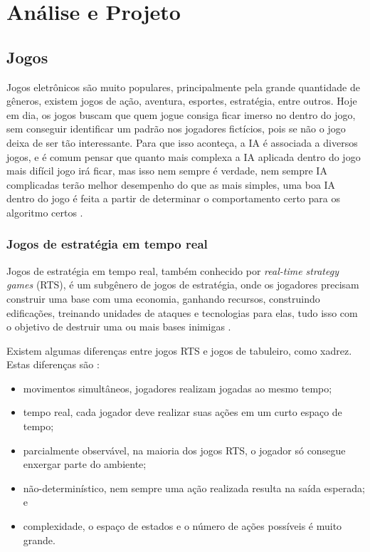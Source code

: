 \chapter{\label{chap:ativ}Análise e Projeto}

\section{Jogos}
Jogos eletrônicos são muito populares, principalmente pela grande quantidade de gêneros, existem jogos de ação, aventura, esportes, estratégia, entre outros. Hoje em dia, os jogos buscam que quem jogue consiga ficar imerso no dentro do jogo, sem conseguir identificar um padrão nos jogadores fictícios, pois se não o jogo deixa de ser tão interessante. Para que isso aconteça, a IA é associada a diversos jogos, e é comum pensar que quanto mais complexa a IA aplicada dentro do jogo mais difícil jogo irá ficar, mas isso nem sempre é verdade, nem sempre IA complicadas terão melhor desempenho do que as mais simples, uma boa IA dentro do jogo é feita a partir de determinar o comportamento certo para os algoritmo certos \cite{millington2009artificial}.

\subsection{Jogos de estratégia em tempo real}

Jogos de estratégia em tempo real, também conhecido por \textit{real-time strategy games} (RTS), é um subgênero de jogos de estratégia, onde os jogadores precisam construir uma base com uma economia, ganhando recursos, construindo edificações, treinando unidades de ataques e tecnologias para elas, tudo isso com o objetivo de destruir uma ou mais bases inimigas \cite{ontanon2013survey, buro2012real}. 

Existem algumas diferenças entre jogos RTS e jogos de tabuleiro, como xadrez. Estas diferenças são \cite{ontanon2013survey}:

\begin{itemize}
	\item movimentos simultâneos, jogadores realizam jogadas ao mesmo tempo;
	\item tempo real, cada jogador deve realizar suas ações em um curto espaço de tempo;
	\item parcialmente observável, na maioria dos jogos RTS, o jogador só consegue enxergar parte do ambiente;
	\item não-determinístico, nem sempre uma ação realizada resulta na saída esperada; e
	\item complexidade, o espaço de estados e o número de ações possíveis é muito grande.
\end{itemize} 


